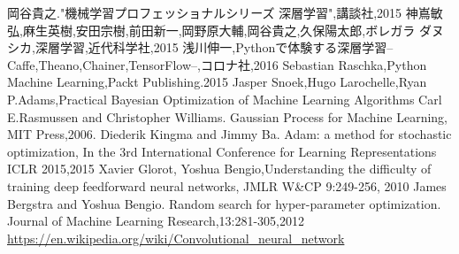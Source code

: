 \begin{thebibliography}{99}
  岡谷貴之."機械学習プロフェッショナルシリーズ 深層学習",講談社,2015
  神嶌敏弘,麻生英樹,安田宗樹,前田新一,岡野原大輔,岡谷貴之,久保陽太郎,ボレガラ ダヌシカ,深層学習,近代科学社,2015
  浅川伸一,Pythonで体験する深層学習--Caffe,Theano,Chainer,TensorFlow--,コロナ社,2016
    Sebastian Raschka,Python Machine Learning,Packt Publishing.2015
  Jasper Snoek,Hugo Larochelle,Ryan P.Adams,Practical Bayesian Optimization of Machine Learning Algorithms
  Carl E.Rasmussen and Christopher Williams. Gaussian Process for Machine Learning, MIT Press,2006.
  Diederik Kingma and Jimmy Ba. Adam: a method for stochastic optimization, In the 3rd International Conference for Learning Representations ICLR 2015,2015
  Xavier Glorot, Yoshua Bengio,Understanding the difficulty of training deep feedforward neural networks, JMLR W\&CP 9:249-256, 2010
   James Bergstra and Yoshua Bengio. Random search for hyper-parameter optimization. Journal of Machine Learning Research,13:281-305,2012
   \url{https://en.wikipedia.org/wiki/Convolutional_neural_network}
\end{thebibliography}




